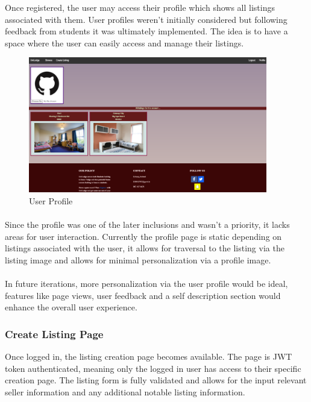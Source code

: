 Once registered, the user may access their profile which shows all listings associated with them. User profiles weren't initially considered but following feedback from students it was ultimately implemented. The idea is to have a space where the user can easily access and manage their listings.

\begin{figure}[H]
	\caption{User Profile}
	\label{image:userprofile}
	\centering
	\includegraphics[width=0.93\textwidth]{images/profile.png}
\end{figure}

\paragraph{}
Since the profile was one of the later inclusions and wasn't a priority, it lacks areas for user interaction. Currently the profile page is static depending on listings associated with the user, it allows for traversal to the listing via the listing image and allows for minimal personalization via a profile image.

\paragraph{}
In future iterations, more personalization via the user profile would be ideal, features like page views, user feedback and a self description section would enhance the overall user experience.


\subsubsection{Create Listing Page}
Once logged in, the listing creation page becomes available. The page is JWT token authenticated, meaning only the logged in user has access to their specific creation page. The listing form is fully validated and allows for the input relevant seller information and any additional notable listing information. 


